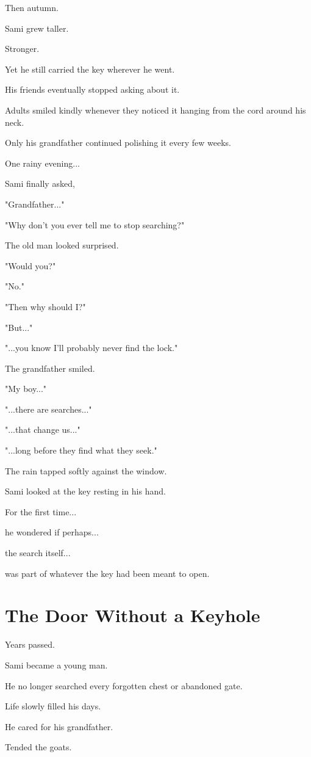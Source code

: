 \documentclass[12pt,openany]{book}
\begin{document}
Then autumn.

Sami grew taller.

Stronger.

Yet he still carried the key wherever he went.

His friends eventually stopped asking about it.

Adults smiled kindly whenever they noticed it hanging from the cord around his neck.

Only his grandfather continued polishing it every few weeks.

One rainy evening...

Sami finally asked,

"Grandfather..."

"Why don't you ever tell me to stop searching?"

The old man looked surprised.

"Would you?"

"No."

"Then why should I?"

"But..."

"...you know I'll probably never find the lock."

The grandfather smiled.

"My boy..."

"...there are searches..."

"...that change us..."

"...long before they find what they seek."

The rain tapped softly against the window.

Sami looked at the key resting in his hand.

For the first time...

he wondered if perhaps...

the search itself...

was part of whatever the key had been meant to open.
\section*{The Door Without a Keyhole}

Years passed.

Sami became a young man.

He no longer searched every forgotten chest or abandoned gate.

Life slowly filled his days.

He cared for his grandfather.

Tended the goats.
\end{document}
